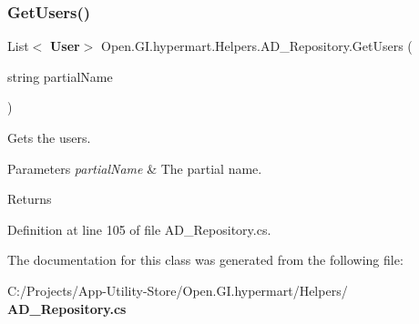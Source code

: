 \subsubsection{Get\+Users()}
{\footnotesize\ttfamily List$<$\textbf{ User}$>$ Open.\+G\+I.\+hypermart.\+Helpers.\+A\+D\+\_\+\+Repository.\+Get\+Users (\begin{DoxyParamCaption}\item[{string}]{partial\+Name }\end{DoxyParamCaption})}



Gets the users. 


\begin{DoxyParams}{Parameters}
{\em partial\+Name} & The partial name.\\
\hline
\end{DoxyParams}
\begin{DoxyReturn}{Returns}

\end{DoxyReturn}


Definition at line 105 of file A\+D\+\_\+\+Repository.\+cs.



The documentation for this class was generated from the following file\+:\begin{DoxyCompactItemize}
\item 
C\+:/\+Projects/\+App-\/\+Utility-\/\+Store/\+Open.\+G\+I.\+hypermart/\+Helpers/\textbf{ A\+D\+\_\+\+Repository.\+cs}\end{DoxyCompactItemize}
